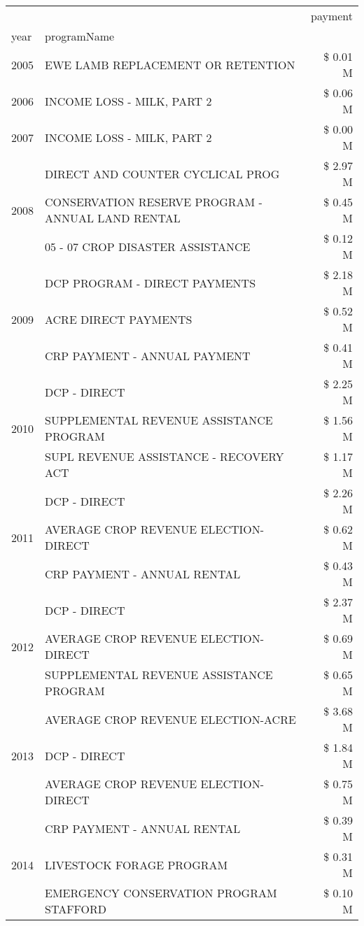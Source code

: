 \begin{tabular}{llr}
\toprule
 &  & payment \\
year & programName &  \\
\midrule
2005 & EWE LAMB REPLACEMENT OR RETENTION & \$ 0.01 M \\
\cline{1-3}
2006 & INCOME LOSS - MILK, PART 2 & \$ 0.06 M \\
\cline{1-3}
2007 & INCOME LOSS - MILK, PART 2 & \$ 0.00 M \\
\cline{1-3}
\multirow[t]{3}{*}{2008} & DIRECT AND COUNTER CYCLICAL PROG & \$ 2.97 M \\
 & CONSERVATION RESERVE PROGRAM - ANNUAL LAND RENTAL & \$ 0.45 M \\
 & 05 - 07 CROP DISASTER ASSISTANCE & \$ 0.12 M \\
\cline{1-3}
\multirow[t]{3}{*}{2009} & DCP PROGRAM - DIRECT PAYMENTS & \$ 2.18 M \\
 & ACRE DIRECT PAYMENTS & \$ 0.52 M \\
 & CRP PAYMENT - ANNUAL PAYMENT & \$ 0.41 M \\
\cline{1-3}
\multirow[t]{3}{*}{2010} & DCP - DIRECT & \$ 2.25 M \\
 & SUPPLEMENTAL REVENUE ASSISTANCE PROGRAM & \$ 1.56 M \\
 & SUPL REVENUE ASSISTANCE - RECOVERY ACT & \$ 1.17 M \\
\cline{1-3}
\multirow[t]{3}{*}{2011} & DCP - DIRECT & \$ 2.26 M \\
 & AVERAGE CROP REVENUE ELECTION-DIRECT & \$ 0.62 M \\
 & CRP PAYMENT - ANNUAL RENTAL & \$ 0.43 M \\
\cline{1-3}
\multirow[t]{3}{*}{2012} & DCP - DIRECT & \$ 2.37 M \\
 & AVERAGE CROP REVENUE ELECTION-DIRECT & \$ 0.69 M \\
 & SUPPLEMENTAL REVENUE ASSISTANCE PROGRAM & \$ 0.65 M \\
\cline{1-3}
\multirow[t]{3}{*}{2013} & AVERAGE CROP REVENUE ELECTION-ACRE & \$ 3.68 M \\
 & DCP - DIRECT & \$ 1.84 M \\
 & AVERAGE CROP REVENUE ELECTION-DIRECT & \$ 0.75 M \\
\cline{1-3}
\multirow[t]{3}{*}{2014} & CRP PAYMENT - ANNUAL RENTAL & \$ 0.39 M \\
 & LIVESTOCK FORAGE PROGRAM & \$ 0.31 M \\
 & EMERGENCY CONSERVATION PROGRAM STAFFORD & \$ 0.10 M \\

\end{tabular}
